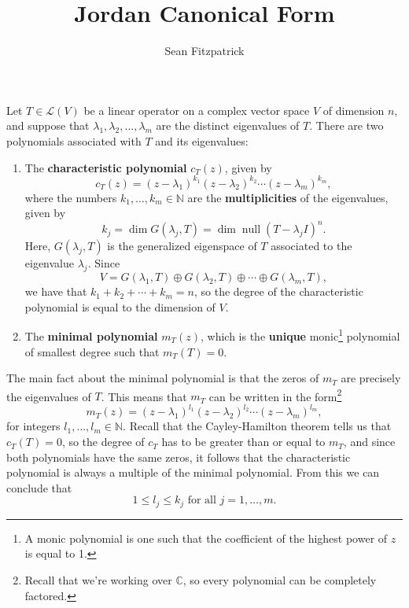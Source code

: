 \documentclass[12pt,letterpaper]{article}
\author{Sean Fitzpatrick}
\title{Jordan Canonical Form}
\theoremstyle{definition}
\renewcommand{\L}{\mathcal{L}}
\DeclareMathOperator{\nul}{null}
\begin{document}
\maketitle

Let $T\in\L(V)$ be a linear operator on a complex vector space $V$ of dimension $n$, and suppose that $\lambda_1,\lambda_2,\ldots, \lambda_m$ are the distinct eigenvalues of $T$. There are two polynomials associated with $T$ and its eigenvalues:

\begin{enumerate}
 \item The {\bf characteristic polynomial} $c_T(z)$, given by 
\[
 c_T(z)=(z-\lambda_1)^{k_1}(z-\lambda_2)^{k_2}\cdots(z-\lambda_m)^{k_m},
\]
where the numbers $k_1,\ldots, k_m\in\mathbb{N}$ are the {\bf multiplicities} of the eigenvalues, given by
\[
 k_j = \dim G(\lambda_j,T) = \dim \nul (T-\lambda_j I)^n.
\]
Here, $G(\lambda_j,T)$ is the generalized eigenspace of $T$ associated to the eigenvalue $\lambda_j$. Since 
\[
 V=G(\lambda_1,T)\oplus G(\lambda_2,T)\oplus\cdots\oplus G(\lambda_m,T),
\]
we have that $k_1+k_2+\cdots +k_m = n$, so the degree of the characteristic polynomial is equal to the dimension of $V$.

 \item The {\bf minimal polynomial} $m_T(z)$, which is the {\bf unique} monic\footnote{A monic polynomial is one such that the coefficient of the highest power of $z$ is equal to 1.} polynomial of smallest degree such that $m_T(T)=0$.

\end{enumerate}
The main fact about the minimal polynomial is that the zeros of $m_T$ are precisely the eigenvalues of $T$. This means that $m_T$ can be written in the form\footnote{Recall that we're working over $\mathbb{C}$, so every polynomial can be completely factored.}
\[
 m_T(z) = (z-\lambda_1)^{l_1}(z-\lambda_2)^{l_2}\cdots (z-\lambda_m)^{l_m},
\]
for integers $l_1,\ldots, l_m\in \mathbb{N}$. Recall that the Cayley-Hamilton theorem tells us that $c_T(T)=0$, so the degree of $c_T$ has to be greater than or equal to $m_T$, and since both polynomials have the same zeros, it follows that the characteristic polynomial is always a multiple of the minimal polynomial. From this we can conclude that
\[
 1\leq l_j\leq k_j \text{ for all } j=1,\ldots, m.
\]
\end{document}
